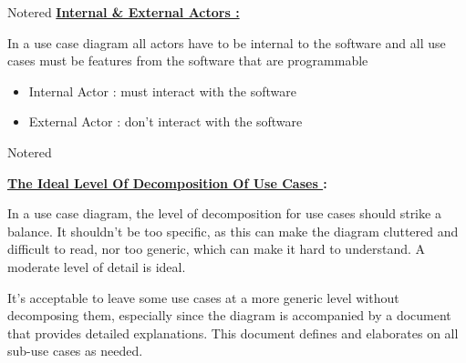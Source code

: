 \begin{center}
\end{center}

\vspace{1cm}
\begin{prettyBox}{Note}{red}
\textbf{\underline{Internal \& External Actors : }}

In a use case diagram all actors have to be internal to the software and all use cases must be
features from the software that are programmable
\begin{itemize}
    \item Internal Actor : must interact with the software 
    \item External Actor : don't interact with the software
\end{itemize}

\end{prettyBox}

\begin{prettyBox}{Note}{red}

\textbf{\underline{The Ideal Level Of Decomposition Of Use Cases }:}

\vspace{0.2cm}
In a use case diagram, the level of decomposition for use cases should strike a balance. It shouldn’t
be too specific, as this can make the diagram cluttered and difficult to read, nor too generic, which
can make it hard to understand. A moderate level of detail is ideal.

\vspace{0.15cm}
It's acceptable to leave some use cases at a more generic level without decomposing them, especially
since the diagram is accompanied by a document that provides detailed explanations. 
This document defines and elaborates on all sub-use cases as needed.

\end{prettyBox}

